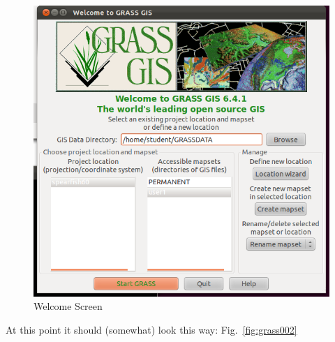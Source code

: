 \begin{figure}[htbp]
   \centering
   \includegraphics[scale=0.4]{grass001.png}
   \caption{Welcome Screen}
   \label{fig:grass001}
\end{figure}

At this point it should (somewhat) look this way: Fig.~\ref{fig:grass002}

